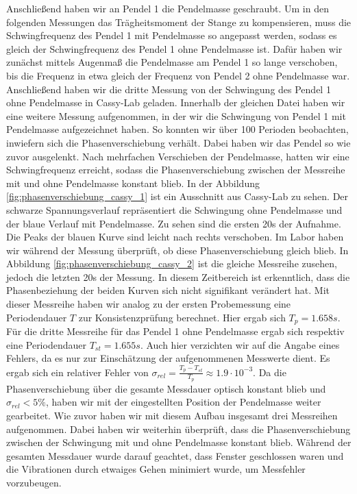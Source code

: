 Anschließend haben wir an Pendel 1 die Pendelmasse geschraubt. Um in den folgenden Messungen das Trägheitsmoment der Stange zu kompensieren, muss die Schwingfrequenz des Pendel 1 mit Pendelmasse so angepasst werden, sodass es gleich der Schwingfrequenz des Pendel 1 ohne Pendelmasse ist. Dafür haben wir zunächst mittels Augenmaß die Pendelmasse am Pendel 1 so lange verschoben, bis die Frequenz in etwa gleich der Frequenz von Pendel 2 ohne Pendelmasse war. Anschließend haben wir die dritte Messung von der Schwingung des Pendel 1 ohne Pendelmasse in Cassy-Lab geladen. Innerhalb der gleichen Datei haben wir eine weitere Messung aufgenommen, in der wir die Schwingung von Pendel 1 mit Pendelmasse aufgezeichnet haben. So konnten wir über 100 Perioden beobachten, inwiefern sich die Phasenverschiebung verhält. Dabei haben wir das Pendel so wie zuvor ausgelenkt. Nach mehrfachen Verschieben der Pendelmasse, hatten wir eine Schwingfrequenz erreicht, sodass die Phasenverschiebung zwischen der Messreihe mit und ohne Pendelmasse konstant blieb. In der Abbildung \ref{fig:phasenverschiebung_cassy_1} ist ein Ausschnitt aus Cassy-Lab zu sehen. Der schwarze Spannungsverlauf repräsentiert die Schwingung ohne Pendelmasse und der blaue Verlauf mit Pendelmasse. Zu sehen sind die ersten 20s der Aufnahme. Die Peaks der blauen Kurve sind leicht nach rechts verschoben. Im Labor haben wir während der Messung überprüft, ob diese Phasenverschiebung gleich blieb. In Abbildung \ref{fig:phasenverschiebung_cassy_2} ist die gleiche Messreihe zusehen, jedoch die letzten 20s der Messung. In diesem Zeitbereich ist erkenntlich, dass die Phasenbeziehung der beiden Kurven sich nicht signifikant verändert hat. Mit dieser Messreihe haben wir analog zu der ersten Probemessung eine Periodendauer $T$ zur Konsistenzprüfung berechnet. Hier ergab sich $T_p=1.658s$. Für die dritte Messreihe für das Pendel 1 ohne Pendelmasse ergab sich respektiv eine Periodendauer $T_{st}=1.655s$. Auch hier verzichten wir auf die Angabe eines Fehlers, da es nur zur Einschätzung der aufgenommenen Messwerte dient. Es ergab sich ein relativer Fehler von $\sigma_{rel}=\frac{T_p-T_{st}}{T_p}\approx 1.9 \cdot 10^{-3}$. Da die Phasenverschiebung über die gesamte Messdauer optisch konstant blieb und $\sigma_{rel}<5 \%$, haben wir mit der eingestellten Position der Pendelmasse weiter gearbeitet. Wie zuvor haben wir mit diesem Aufbau insgesamt drei Messreihen aufgenommen. Dabei haben wir weiterhin überprüft, dass die Phasenverschiebung zwischen der Schwingung mit und ohne Pendelmasse konstant blieb. Während der gesamten Messdauer wurde darauf geachtet, dass Fenster geschlossen waren und die Vibrationen durch etwaiges Gehen minimiert wurde, um Messfehler vorzubeugen.\\
